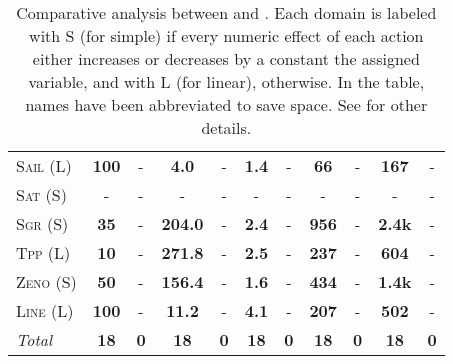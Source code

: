 \documentclass[11pt,landscape]{article}
\begin{document}
\begin{table*}[tb]
{\begin{tabular}{|l||cc||cc||cc||cc||cc||}
\textsc{Sail} (L)&\textbf{100}&-&\textbf{4.0}&-&\textbf{1.4}&-&\textbf{66}&-&\textbf{167}&-\\
\textsc{Sat} (S)&-&-&-&-&-&-&-&-&-&-\\
\textsc{Sgr} (S)&\textbf{35}&-&\textbf{204.0}&-&\textbf{2.4}&-&\textbf{956}&-&\textbf{2.4k}&-\\
\textsc{Tpp} (L)&\textbf{10}&-&\textbf{271.8}&-&\textbf{2.5}&-&\textbf{237}&-&\textbf{604}&-\\
\textsc{Zeno} (S)&\textbf{50}&-&\textbf{156.4}&-&\textbf{1.6}&-&\textbf{434}&-&\textbf{1.4k}&-\\
\textsc{Line} (L)&\textbf{100}&-&\textbf{11.2}&-&\textbf{4.1}&-&\textbf{207}&-&\textbf{502}&-
\\\hline
\textit{Total}&\textbf{18}&\textbf{0}&\textbf{18}&\textbf{0}&\textbf{18}&\textbf{0}&\textbf{18}&\textbf{0}&\textbf{18}&\textbf{0}\\\hline

        \end{tabular}}
        \caption{Comparative analysis between  \pattya and \pattye. Each domain is labeled with S (for simple) if every numeric effect of each action either increases or decreases by a constant the assigned variable, and with L (for linear), otherwise. In the table, names have been abbreviated to save space.  See \cite{ipc2023} for other details.}
        \label{tab:exp-patty-a-patty-e}
        \end{table*}
        
\end{document}
